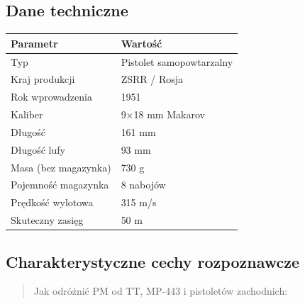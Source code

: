 \documentclass[12pt,oneside]{book}
\begin{document}
\subsection{Dane techniczne}\label{dane-techniczne-101}

\begin{longtable}[]{@{}ll@{}}
\toprule\noalign{}
Parametr & Wartość \\
\midrule\noalign{}
\endhead
\bottomrule\noalign{}
\endlastfoot
Typ & Pistolet samopowtarzalny \\
Kraj produkcji & ZSRR / Rosja \\
Rok wprowadzenia & 1951 \\
Kaliber & 9×18 mm Makarov \\
Długość & 161 mm \\
Długość lufy & 93 mm \\
Masa (bez magazynka) & 730 g \\
Pojemność magazynka & 8 nabojów \\
Prędkość wylotowa & 315 m/s \\
Skuteczny zasięg & 50 m \\
\end{longtable}

\subsection{Charakterystyczne cechy
rozpoznawcze}\label{charakterystyczne-cechy-rozpoznawcze-101}

\begin{quote}
Jak odróżnić PM od TT, MP-443 i pistoletów zachodnich:
\end{quote}
\end{document}

